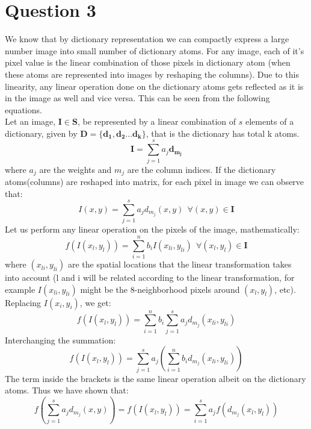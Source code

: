 \documentclass[12pt]{article}
\begin{document}
\section*{Question 3}
We know that by dictionary representation we can compactly express a large number image into small number of dictionary atoms. For any image, each of it's pixel value is the linear combination of those pixels in dictionary atom (when these atoms are represented into images by reshaping the columns). Due to this linearity, any linear operation done on the dictionary atoms gets reflected as it is in the image as well and vice versa. This can be seen from the following equations. \\
Let an image, $\boldsymbol{I} \in \boldsymbol{S}$, be represented by a linear combination of $s$ elements of a dictionary, given by $\boldsymbol{D} = \{\boldsymbol{d_1}, \boldsymbol{d_2}... \boldsymbol{d_k}\}$, that is the dictionary has total k atoms.
\begin{equation*}
    \boldsymbol{I} = \sum_{j=1}^{s} a_j\boldsymbol{d_{m_j}}  
\end{equation*}
where $a_j$ are the weights and $m_j$ are the column indices. If the dictionary atoms(columns) are reshaped into matrix, for each pixel in image we can observe that:
\begin{equation*}
    I(x,y) = \sum_{j=1}^{s} a_jd_{m_j}(x,y) \ \ \forall (x,y) \in \boldsymbol{I}
\end{equation*}
Let us perform any linear operation on the pixels of the image, mathematically:
\begin{equation*}
    f(I(x_l,y_l)) = \sum_{i=1}^{n}b_iI(x_{li},y_{li}) \ \ \forall (x_l,y_l) \in \boldsymbol{I}
\end{equation*}
where $(x_{li}, y_{li})$ are the spatial locations that the linear transformation takes into account (l and i will be related according to the linear transformation, for example $I(x_{li}, y_{li})$ might be the 8-neighborhood pixels around $(x_l, y_l)$, etc). Replacing $I(x_i, y_i)$, we get:
\begin{equation*}
    f(I(x_l,y_l)) = \sum_{i=1}^{n}b_i\sum_{j=1}^{s} a_jd_{m_j}(x_{li},y_{li})
\end{equation*}
Interchanging the summation:
\begin{equation*}
    f(I(x_l,y_l)) = \sum_{j=1}^{s}a_j(\sum_{i=1}^{n}b_i d_{m_j}(x_{li},y_{li}))
\end{equation*}
The term inside the brackets is the same linear operation albeit on the dictionary atoms. Thus we have shown that:
\begin{equation*}
    f(\sum_{j=1}^{s} a_jd_{m_j}(x,y)) = f(I(x_l,y_l)) = \sum_{i=1}^{s}a_jf(d_{m_j}(x_l,y_l)) 
\end{equation*}
\end{document}
